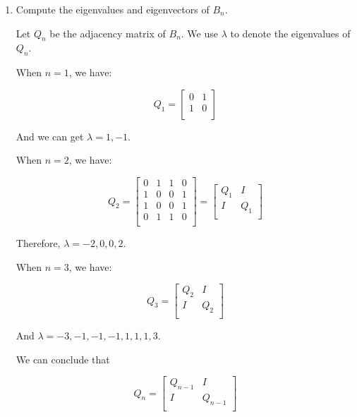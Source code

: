 \begin{enumerate}
  \item Compute the eigenvalues and eigenvectors of $B_n$.
    
  \Answer

  Let $Q_n$ be the adjacency matrix of $B_n$. We use $\lambda$ to denote the eigenvalues of $Q_n$.
  
  When $n = 1$, we have:

  \begin{equation}
    Q_1=\begin{bmatrix}
    0 & 1 \\
    1 & 0 \\
    \end{bmatrix}
  \end{equation}
  
  And we can get $\lambda=1,-1$.
  
  When $n = 2$, we have:

  \begin{equation}
    Q_2=\begin{bmatrix}
    0 & 1 & 1 & 0 \\
    1 & 0 & 0 & 1 \\
    1 & 0 & 0 & 1 \\
    0 & 1 & 1 & 0 \\
    \end{bmatrix}
    =\begin{bmatrix}
    Q_1 & I \\
    I & Q_1 \\
    \end{bmatrix}
  \end{equation}

  Therefore, $\lambda=-2,0,0,2$.
  
  When $n = 3$, we have:

  \begin{equation}
    Q_3=\begin{bmatrix}
    Q_2 & I \\
    I & Q_2 \\
    \end{bmatrix}
  \end{equation}

  And $\lambda=-3, -1, -1, -1, 1, 1, 1, 3$.
  
  We can conclude that

  \begin{equation}
    Q_n=\begin{bmatrix}
    Q_{n-1} & I \\
    I & Q_{n-1} \\
    \end{bmatrix}
  \end{equation}


\end{enumerate}

